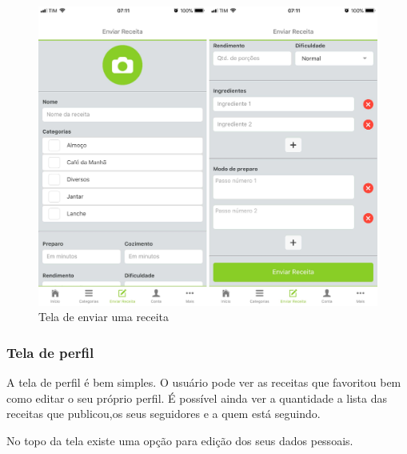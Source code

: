 \begin{figure}[H]
	\caption{\label{fig:tela-de-5}Tela de enviar uma receita}
	\centering
	\includegraphics[scale=0.15]{imagens/figura16.jpg}
\end{figure}

\subsubsection{Tela de perfil}
A tela de perfil é bem simples. O usuário pode ver as receitas que favoritou bem como editar o seu próprio perfil. É possível ainda ver a quantidade a lista das receitas que publicou,os seus seguidores e a quem está seguindo.

No topo da tela existe uma opção para edição dos seus dados pessoais.

